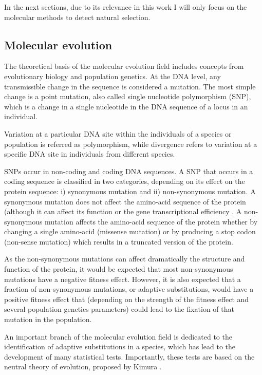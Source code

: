 In the next sections, due to its relevance in this work I will only focus on the molecular methods to detect natural selection.

\subsection{Molecular evolution}

The theoretical basis of the molecular evolution field includes concepts from evolutionary biology and population genetics. At the DNA level, any transmissible change in the sequence is considered a mutation. 
The most simple change is a point mutation, also called single nucleotide polymorphism (SNP),
which is a change in a single nucleotide in the DNA sequence of a locus in an individual.

Variation at a particular DNA site within the individuals of a species or population is referred as polymorphism, while divergence refers to variation at a specific DNA site in individuals from different species.

SNPs occur in non-coding and coding DNA sequences. A SNP that occurs in a coding sequence is classified in two categories, depending on its effect on the protein sequence: i) synonymous mutation and ii) non-synonymous mutation.
A synonymous mutation does not affect the amino-acid sequence of the protein (although it can affect its function 
	\citep{Kimchi-Sarfaty2007} or the gene transcriptional efficiency \citep{Xia1996}.
A non-synonymous mutation affects the amino-acid sequence of the protein whether by changing a single amino-acid (missense mutation) or by producing a stop codon (non-sense mutation) which results in a truncated version of the protein.

As the non-synonymous mutations can affect dramatically the structure and function of the protein, it would be expected that most non-synonymous mutations have a negative fitness effect.
However, it is also expected that a fraction of non-synonymous mutations, or adaptive substitutions, would have a positive fitness effect that (depending on the strength of the fitness effect and several population genetics parameters) could lead to the fixation of that mutation in the population.

An important branch of the molecular evolution field is dedicated to the identification of adaptive substitutions in a species, which has lead to the development of many statistical tests. 
Importantly, these tests are based on the neutral theory of evolution, proposed by Kimura
	\citep{Kimura1968}.

